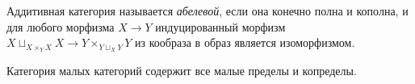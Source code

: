 \documentclass[
	extrafontsizes,
	11pt,
	hyphens,
]{memoir}
\begin{document}

\begin{definition}
Аддитивная категория называется \emph{абелевой}, если
она конечно полна и кополна, и
для любого морфизма \(X \to Y\)
индуцированный морфизм
\(X \sqcup_{X \times_Y X} X \to Y \times_{Y \sqcup_X Y} Y\)
из кообраза в образ
является изоморфизмом.
\end{definition}

\begin{observation}
Категория малых категорий содержит все малые пределы и копределы.
\end{observation}



%
\end{document}
